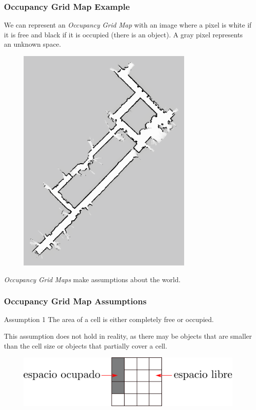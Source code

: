 \begin{frame}
    \frametitle{Occupancy Grid Map Example}
    
    We can represent an \emph{Occupancy Grid Map} with an image where a pixel is white if it is free and black if it is occupied (there is an object). A gray pixel represents an unknown space.
    
    \begin{figure}[!h]
    \includegraphics[width=0.23\columnwidth]{./images/volumetric_map_2d.png}
    \end{figure}
    
    \emph{Occupancy Grid Maps} make assumptions about the world.
    
\end{frame}
    
\begin{frame}
    \frametitle{Occupancy Grid Map Assumptions}
    
    \begin{block}{Assumption 1}
    The area of a cell is either completely free or occupied.
    \end{block}
    
    This assumption does not hold in reality, as there may be objects that are smaller than the cell size or objects that partially cover a cell.
    
    \begin{figure}[!h]
        \includegraphics[width=0.7\columnwidth]{./images/grid_map.pdf}
    \end{figure}

\end{frame}
    
